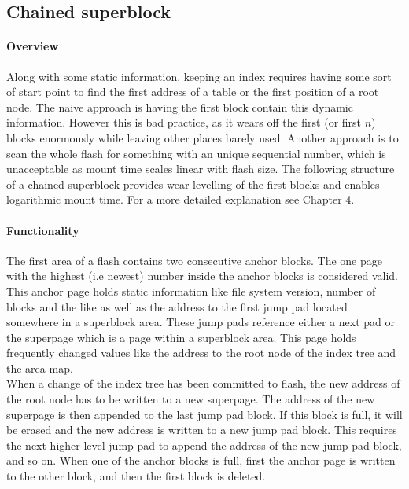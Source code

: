 \subsection{Chained superblock}
\label{sub:chainedSB}
\paragraph{Overview}
Along with some static information, keeping an index requires having some sort of start point to find the first address of a table or the first position of a root node. The naive approach is having the first block contain this dynamic information. However this is bad practice, as it wears off the first (or first $n$) blocks enormously while leaving other places barely used. Another approach is to scan the whole flash for something with an unique sequential number, which is unacceptable as mount time scales linear with flash size.
The following structure of a chained superblock provides wear levelling of the first blocks and enables logarithmic mount time.
For a more detailed explanation see  Chapter 4.

\paragraph{Functionality}
The first area of a flash contains two consecutive anchor blocks. The one page with the highest (i.e newest) number inside the anchor blocks is considered valid. This anchor page holds static information like file system version, number of blocks and the like as well as the address to the first jump pad located somewhere in a superblock area. These jump pads reference either a next pad or the superpage which is a page within a superblock area. This page holds frequently changed values like the address to the root node of the index tree and the area map.\\

When a change of the index tree has been committed to flash, the new address of the root node has to be written to a new superpage. The address of the new superpage is then appended to the last jump pad block. If this block is full, it will be erased and the new address is written to a new jump pad block. This requires the next higher-level jump pad to append the address of the new jump pad block, and so on. When one of the anchor blocks is full, first the anchor page is written to the other block, and then the first block is deleted.\\



